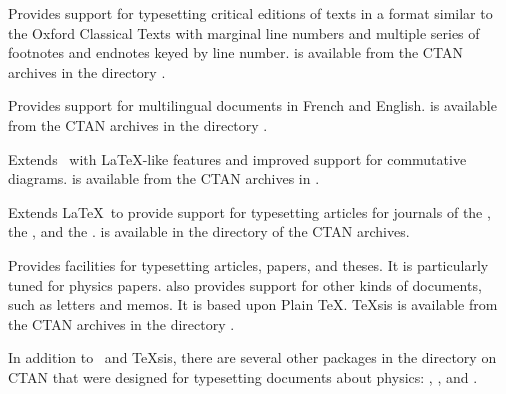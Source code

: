 \begin{iplist}{.25in}
  \ipitem [EDMAC]

    Provides support for typesetting critical editions of texts
    in a format similar to the Oxford Classical Texts with marginal line
    numbers and multiple series of footnotes and endnotes keyed by line
    number.   is 
    available from the CTAN archives in the directory
    .

  \ipitem [\INRSTeX]

    Provides support for multilingual documents in French and 
    English.   is 
    available from the CTAN archives in the directory
    .

\newpage
  \ipitem [\LamSTeX]

    Extends \AMSTeX\ with \LaTeX-like features and improved
    support for commutative diagrams.   is available from the CTAN
    archives in .

  \ipitem [\REVTeX]

    Extends \LaTeX\ to provide support for typesetting articles
    for journals of the , 
    the , and the .   is available in
    the directory  of the CTAN archives. 


    Provides facilities for typesetting articles, papers, and
    theses.  It is particularly tuned for physics 
    papers.   also
    provides support for other kinds of documents, such as letters and memos.
    It is based upon Plain \TeX.  \TeX{}sis is available from the CTAN
    archives in the directory .

    In addition to \REVTeX\ and \TeX{}sis, there are several other packages in
    the  directory on CTAN that were designed for
    typesetting documents about 
    physics: , 
    , 
    and .



\end{iplist}
